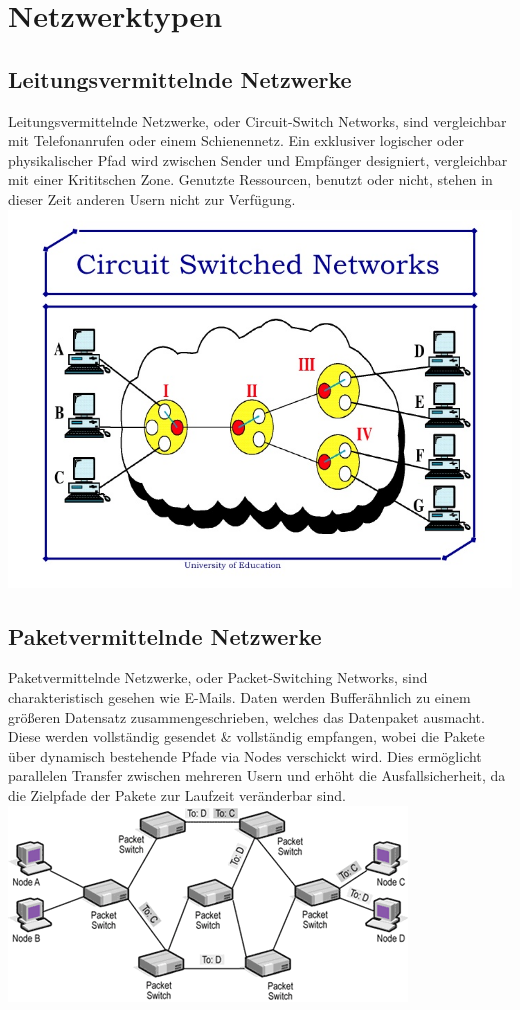 \documentclass[11pt]{article}
\begin{document}
    \section{Netzwerktypen}
    \subsection{Leitungsvermittelnde Netzwerke}
    Leitungsvermittelnde Netzwerke, oder Circuit-Switch Networks, sind vergleichbar mit Telefonanrufen oder einem Schienennetz. Ein exklusiver logischer oder physikalischer
    Pfad wird zwischen Sender und Empfänger designiert, vergleichbar mit einer Krititschen Zone. Genutzte
    Ressourcen, benutzt oder nicht, stehen in dieser Zeit anderen Usern nicht zur Verfügung.\\

        \includegraphics[width=\textwidth]{Circuit_SwitchNetwork.jpg}

    \subsection{Paketvermittelnde Netzwerke}
    Paketvermittelnde Netzwerke, oder Packet-Switching Networks, sind charakteristisch gesehen wie E-Mails. Daten werden Bufferähnlich zu einem größeren Datensatz zusammengeschrieben,
    welches das Datenpaket ausmacht. Diese werden vollständig gesendet \& vollständig empfangen, wobei
    die Pakete über dynamisch bestehende Pfade via Nodes verschickt wird. Dies ermöglicht parallelen Transfer zwischen
    mehreren Usern und erhöht die Ausfallsicherheit, da die Zielpfade der Pakete zur Laufzeit veränderbar sind.\\

        \includegraphics[width=\textwidth]{PacketSwitching_Networks.png}
\end{document}

